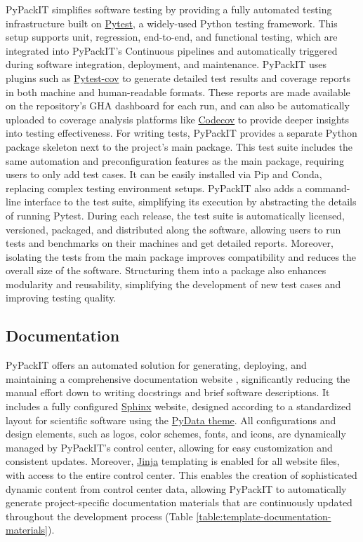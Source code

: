 \documentclass{article}
\begin{document}
PyPackIT simplifies software testing by providing a fully automated testing infrastructure built on \href{https://pytest.org/}{Pytest}, a widely-used Python testing framework. This setup supports unit, regression, end-to-end, and functional testing, which are integrated into PyPackIT's Continuous pipelines and automatically triggered during software integration, deployment, and maintenance. PyPackIT uses plugins such as \href{https://github.com/pytest-dev/pytest-cov}{Pytest-cov} to generate detailed test results and coverage reports in both machine and human-readable formats. These reports are made available on the repository's GHA dashboard for each run, and can also be automatically uploaded to coverage analysis platforms like \href{https://codecov.io/}{Codecov} to provide deeper insights into testing effectiveness. For writing tests, PyPackIT provides a separate Python package skeleton next to the project's main package. This test suite includes the same automation and preconfiguration features as the main package, requiring users to only add test cases. It can be easily installed via Pip and Conda, replacing complex testing environment setups. PyPackIT also adds a command-line interface to the test suite, simplifying its execution by abstracting the details of running Pytest. During each release, the test suite is automatically licensed, versioned, packaged, and distributed along the software, allowing users to run tests and benchmarks on their machines and get detailed reports. Moreover, isolating the tests from the main package improves compatibility and reduces the overall size of the software. Structuring them into a package also enhances modularity and reusability, simplifying the development of new test cases and improving testing quality.

\subsection{Documentation}

PyPackIT offers an automated solution for generating, deploying, and maintaining a comprehensive documentation website \cite{TenSimpleRulesForDocumentingSciSoft, WhatMakesCompSoftSuccessful}, significantly reducing the manual effort down to writing docstrings and brief software descriptions. It includes a fully configured \href{https://www.sphinx-doc.org}{Sphinx} website, designed according to a standardized layout for scientific software using the \href{https://pydata-sphinx-theme.readthedocs.io/}{PyData theme}. All configurations and design elements, such as logos, color schemes, fonts, and icons, are dynamically managed by PyPackIT's control center, allowing for easy customization and consistent updates. Moreover, \href{https://jinja.palletsprojects.com/}{Jinja} templating is enabled for all website files, with access to the entire control center. This enables the creation of sophisticated dynamic content from control center data, allowing PyPackIT to automatically generate project-specific documentation materials that are continuously updated throughout the development process (Table \ref{table:template-documentation-materials}).
\end{document}
